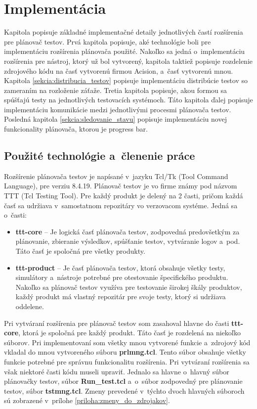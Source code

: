 \chapter{Implementácia}
\label{kapitola:implementacia}
Kapitola popisuje základné implementačné detaily jednotlivých častí rozšírenia pre plánovač testov.
Prvá kapitola popisuje, aké technológie boli pre implementáciu rozšírenia plánovača použité.
Nakoľko sa jedná o~implementáciu rozšírenia pre nástroj, ktorý už bol vytvorený, kapitola taktiež popisuje 
rozdelenie zdrojového kódu na časť vytvorenú firmou Acision, a~časť vytvorenú mnou.
Kapitola \ref{sekcia:distribucia_testov} popisuje implementáciu distribúcie testov so zameraním na 
rozloženie záťaže. Tretia kapitola popisuje, akou formou sa spúšťajú testy na jednotlivých testovacích
systémoch. Táto kapitola ďalej popisuje implementáciu komunikácie medzi jednotlivými procesmi plánovača testov.
Posledná kapitola \ref{sekcia:sledovanie_stavu} popisuje implementáciu novej funkcionality plánovača, ktorou je progress bar.

\section{Použité technológie a~členenie práce}
\label{sekcia:pouzite_technologie}
Rozšírenie plánovača testov je napísané v~jazyku Tcl/Tk (Tool Command Language), pre verziu 8.4.19.
Plánovač testov je vo firme známy pod názvom TTT (Tcl Testing Tool).
Pre každý produkt je delený na 2 časti, pričom každá časť sa udržiava v~samostatnom repozitáry vo verzovacom systéme.
Jedná sa o~časti: 
\begin{itemize}
\item \textbf{ttt-core} -- Je logická časť plánovača testov, zodpovedná predovšetkým za plánovanie, zbieranie výsledkov,
spúšťanie testov, vytváranie logov a~pod. Táto časť je spoločná pre všetky produkty. 
\item \textbf{ttt-product} -- Je časť plánovača testov, ktorá obsahuje všetky testy, simulátory a~nástroje potrebné pre 
otestovanie špecifického produktu. Nakoľko sa plánovač testov využíva pre testovanie širokej škály produktov, 
každý produkt má vlastný repozitár pre svoje testy, ktorý si udržiava oddelene.
\end{itemize} 

Pri vytváraní rozšírenia pre plánovač testov som zasahoval hlavne do časti \textbf{ttt-core}, ktorá je spoločná pre každý produkt.
Táto časť je rozdelená na niekoľko súborov. Pri implementovaní som všetky mnou vytvorené funkcie a~zdrojový kód vkladal do
mnou vytvoreného súboru \textbf{prlmng.tcl}. Tento súbor obsahuje všetky funkcie potrebné pre správnu funkcionalitu rozšírenia.
Pri vytváraní rozšírenia sa však niektoré časti kódu museli upraviť. Jednalo sa hlavne o~hlavný súbor plánovačky testov, súbor
\textbf{Run\_test.tcl} a~o~súbor zodpovedný pre plánovanie testov, súbor \textbf{tstmng.tcl}. 
Zmeny prevedené v~týchto dvoch hlavných súboroch sú zobrazené v~prílohe \ref{priloha:zmeny_do_zdrojakov}.

